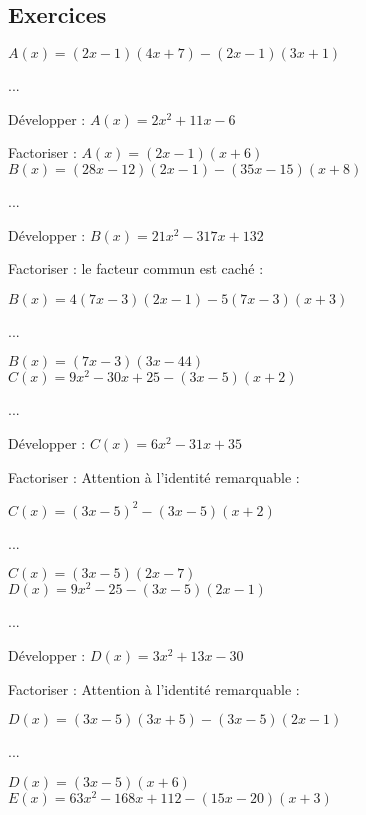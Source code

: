 \newpage

\subsection{Exercices}

$ A(x) = \left(2x-1\right)\left(4x+7\right) - \left(2x-1\right)\left(3x+1\right) $ 

...

Développer : $ A(x) = 2x^2 + 11x -6 $ 

Factoriser : $ A(x) = \left(2x-1\right)\left(x+6\right) $ \\

$ B(x) = \left(28x-12\right)\left(2x-1\right)-\left(35x-15\right)\left(x+8\right) $ 

...  

Développer : $ B(x) =21x^2 - 317x + 132 $ 

Factoriser : le facteur commun est caché : 

$ B(x) = 4\left(7x-3\right)\left(2x-1\right)-5\left(7x-3\right)\left(x+3\right) $ 

... 

$B(x) =\left(7x-3\right)\left(3x-44\right) $ \\

$ C(x) = 9x^2-30x+25-\left(3x-5\right)\left(x+2\right) $

...

Développer : $ C(x) = 6x^2 - 31x + 35 $

Factoriser : Attention à l'identité remarquable :

$ C(x) = \left(3x-5\right)^2-\left(3x-5\right)\left(x+2\right) $

...
 
$ C(x) = \left(3x-5\right)\left(2x-7\right) $ \\

$ D(x) = 9x^2-25-\left(3x-5\right)\left(2x-1\right) $

...

Développer : $ D(x) = 3x^2 + 13x - 30 $

Factoriser : Attention à l'identité remarquable :

$ D(x) = \left(3x-5\right)\left(3x+5\right)-\left(3x-5\right)\left(2x-1\right) $

...

$ D(x) = \left(3x-5\right)\left(x+6\right) $ \\

$ E(x) = 63x^2-168x+112-\left(15x-20\right)\left(x+3\right) $

